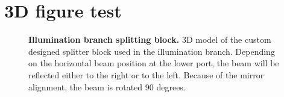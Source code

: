 \documentclass{diploma_style}
\begin{document}
	
	
	
	\section{3D figure test}
	
\begin{figure}[htb]
\centering
\caption{\textbf{Illumination branch splitting block.} 3D model of the custom designed splitter block used in the illumination branch. Depending on the horizontal beam position at the lower port, the beam will be reflected either to the right or to the left. Because of the mirror alignment, the beam is rotated 90 degrees.}
\label{fig:splitter}
\end{figure}
\end{document}
